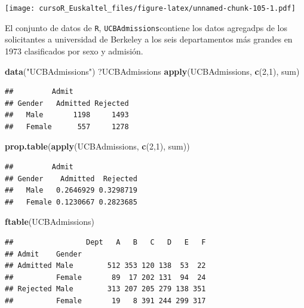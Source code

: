 \documentclass[]{book}
\newenvironment{Shaded}{\begin{snugshade}}{\end{snugshade}}
\newcommand{\KeywordTok}[1]{\textcolor[rgb]{0.13,0.29,0.53}{\textbf{#1}}}
\newcommand{\DecValTok}[1]{\textcolor[rgb]{0.00,0.00,0.81}{#1}}
\newcommand{\StringTok}[1]{\textcolor[rgb]{0.31,0.60,0.02}{#1}}
\newcommand{\NormalTok}[1]{#1}
\begin{document}
\texttt{[image: cursoR\_Euskaltel\_files/figure-latex/unnamed-chunk-105-1.pdf]}

El conjunto de datos de \texttt{R}, \texttt{UCBAdmissions}contiene los
datos agregadps de los solicitantes a universidad de Berkeley a los seis
departamentos más grandes en 1973 clasificados por sexo y admisión.

\begin{Shaded}
\begin{Highlighting}[]
\KeywordTok{data}\NormalTok{(}\StringTok{"UCBAdmissions"}\NormalTok{)}
\NormalTok{?UCBAdmissions}
\KeywordTok{apply}\NormalTok{(UCBAdmissions, }\KeywordTok{c}\NormalTok{(}\DecValTok{2}\NormalTok{,}\DecValTok{1}\NormalTok{), sum)}
\end{Highlighting}
\end{Shaded}

\begin{verbatim}
##         Admit
## Gender   Admitted Rejected
##   Male       1198     1493
##   Female      557     1278
\end{verbatim}

\begin{Shaded}
\begin{Highlighting}[]
\KeywordTok{prop.table}\NormalTok{(}\KeywordTok{apply}\NormalTok{(UCBAdmissions, }\KeywordTok{c}\NormalTok{(}\DecValTok{2}\NormalTok{,}\DecValTok{1}\NormalTok{), sum))}
\end{Highlighting}
\end{Shaded}

\begin{verbatim}
##         Admit
## Gender    Admitted  Rejected
##   Male   0.2646929 0.3298719
##   Female 0.1230667 0.2823685
\end{verbatim}

\begin{Shaded}
\begin{Highlighting}[]
\KeywordTok{ftable}\NormalTok{(UCBAdmissions)}
\end{Highlighting}
\end{Shaded}

\begin{verbatim}
##                 Dept   A   B   C   D   E   F
## Admit    Gender                             
## Admitted Male        512 353 120 138  53  22
##          Female       89  17 202 131  94  24
## Rejected Male        313 207 205 279 138 351
##          Female       19   8 391 244 299 317
\end{verbatim}
\end{document}

